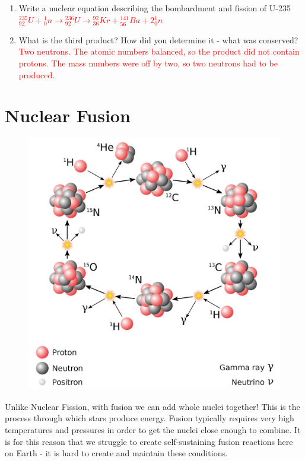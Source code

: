 \documentclass[12pt]{report}
\makeatletter
\DeclareRobustCommand{\StudentVSpace}[2]{%
	\ifthenelse{\boolean{@answer}}
	{\textcolor{red}{\\#1}}
	{\vspace{#2}}
}
\makeatother
\begin{document}
\begin{enumerate}
	\item Write a nuclear equation describing the bombardment and fission of U-235
	      \StudentVSpace{
	      ${}^{235}_{92}U + {}^{1}_{0}n \rightarrow {}^{236}_{92}U \rightarrow {}^{92}_{36}Kr + {}^{141}_{56}Ba + 2{}^{1}_{0}n$
	      }{1.5cm}

	\item What is the third product? How did you determine it - what was conserved?
	      \StudentVSpace{
		      Two neutrons. The atomic numbers balanced, so the product did not contain protons. The mass numbers were off by two, so two neutrons had to be produced.
	      }{2cm}
\end{enumerate}

\section{Nuclear Fusion}

\begin{figure}
	\centering
	\includegraphics[width=0.9\linewidth]{CNO-cycle.png}
\end{figure}

Unlike Nuclear Fission, with fusion we can add whole nuclei together! This is the process through which stars produce energy. Fusion typically requires very high temperatures and pressures in order to get the nuclei close enough to combine. It is for this reason that we struggle to create self-sustaining fusion reactions here on Earth - it is hard to create and maintain these conditions.
\end{document}
